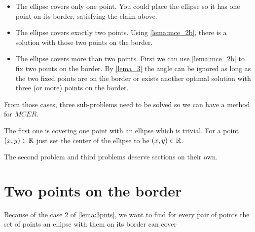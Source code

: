 \begin{itemize}
	\item The ellipse covers only one point. You could place the ellipse so it has one point on its border, satisfying the claim above.
	\item The ellipse covers exactly two points. Using \autoref{lema:mce_2b}, there is a solution with those two points on the border.
	\item The ellipse covers more than two points. First we can use \autoref{lema:mce_2b} to fix two points on the border. By \autoref{lema_3} the angle can be ignored as long as the two fixed points are on the border or exists another optimal solution with three (or more) points on the border.
\end{itemize}

From those cases, three sub-problems need to be solved so we can have a method for $MCER$.

The first one is covering one point with an ellipse which is trivial. For a point $(x, y) \in \mathbb{R}$ just set the center of the ellipse to be $(x, y) \in \mathbb{R}$.

The second problem and third problems deserve sections on their own.

\section{Two points on the border}

Because of the case 2 of \autoref{lema:3pnts}, we want to find for every pair of points the set of points an ellipse with them on its border can cover


 